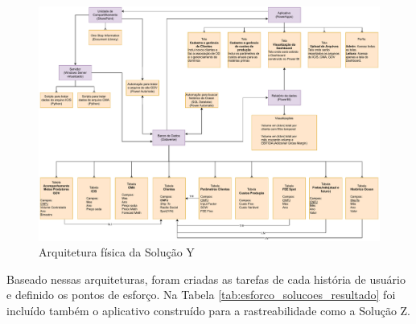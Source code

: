 	\begin{figure}[!h]
		\centering
		\includegraphics[width=1\textwidth]{./figuras/oneStopArqFis.pdf}
		\caption{Arquitetura física da Solução Y}
		\label{fig:metodologia:solucaoYArqFis}
	\end{figure}

	Baseado nessas arquiteturas, foram criadas as tarefas de cada história de usuário e definido os pontos de esforço. Na Tabela \ref{tab:esforco_solucoes_resultado} foi incluído
	também o aplicativo construído para a rastreabilidade como a Solução Z.

